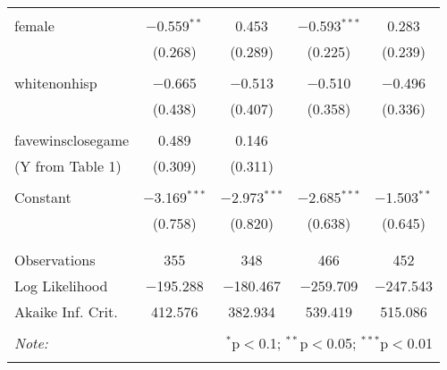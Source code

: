 \documentclass{article}
\begin{document}
\begin{table}[!htbp]
\begin{tabular}{@{\extracolsep{5pt}}lcccc}
  & & & & \\ 
 female & $-$0.559$^{**}$ & 0.453 & $-$0.593$^{***}$ & 0.283 \\ 
  & (0.268) & (0.289) & (0.225) & (0.239) \\ 
  & & & & \\ 
 whitenonhisp & $-$0.665 & $-$0.513 & $-$0.510 & $-$0.496 \\ 
  & (0.438) & (0.407) & (0.358) & (0.336) \\ 
  & & & & \\ 
 favewinsclosegame & 0.489 & 0.146 &  &  \\ 
 (Y from Table 1) & (0.309) & (0.311) &  &  \\ 
  & & & & \\ 
 Constant & $-$3.169$^{***}$ & $-$2.973$^{***}$ & $-$2.685$^{***}$ & $-$1.503$^{**}$ \\ 
  & (0.758) & (0.820) & (0.638) & (0.645) \\ 
  & & & & \\ 
\hline \\[-1.8ex] 
Observations & 355 & 348 & 466 & 452 \\ 
Log Likelihood & $-$195.288 & $-$180.467 & $-$259.709 & $-$247.543 \\ 
Akaike Inf. Crit. & 412.576 & 382.934 & 539.419 & 515.086 \\ 
\hline 
\hline \\[-1.8ex] 
\textit{Note:}  & \multicolumn{4}{r}{$^{*}$p$<$0.1; $^{**}$p$<$0.05; $^{***}$p$<$0.01} \\ 
\normalsize 
\end{tabular} 
\end{table} 
\end{document}
